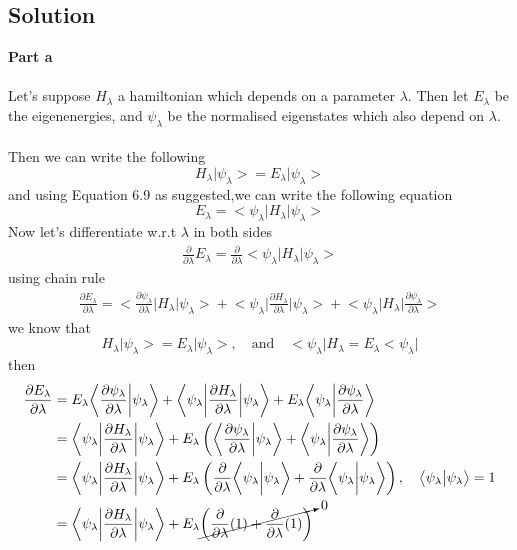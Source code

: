\documentclass[12 pt]{article}
\numberwithin{equation}{section}
\begin{document}
\subsection*{Solution}
\textbf{Part a}\\
\\
Let's suppose $H_\lambda$ a hamiltonian which depends on a parameter $\lambda$. Then let $E_\lambda$
be the eigenenergies, and $\psi_\lambda$ be the normalised
eigenstates which also depend on $\lambda$.\\
\\
Then we can write the following 
\[
  H_\lambda \big|\psi_\lambda\big> = E_\lambda\big|\psi_\lambda\big>
\]
and using Equation 6.9 as suggested,we can write the following equation
\[
  E_\lambda = \big<\psi_\lambda\big|H_\lambda\big|\psi_\lambda\big>
\]
Now let's differentiate w.r.t $\lambda$ in both sides
\begin{align*}
  \frac{\partial}{\partial \lambda} E_\lambda = \frac{\partial}{\partial \lambda}
  \big<\psi_\lambda\big|H_\lambda\big|\psi_\lambda\big>
\end{align*}
using chain rule
\begin{align*}
  \frac{\partial E_\lambda}{\partial \lambda} =
  \bigg<\frac{\partial \psi_\lambda}{\partial \lambda}\bigg|H_\lambda\bigg|\psi_\lambda\bigg>
  + \bigg<\psi_\lambda\bigg|\frac{\partial H_\lambda}{\partial \lambda}\bigg|\psi_\lambda\bigg>
  +  \bigg<\psi_\lambda\bigg|H_\lambda\bigg|\frac{\partial \psi_\lambda}{\partial \lambda}\bigg>
\end{align*}
we know that
\[
  H_\lambda\big|\psi_\lambda\big> =  E_\lambda\big|\psi_\lambda\big>,\quad \text{and}
  \quad\big<\psi_\lambda\big|H_\lambda = E_\lambda\big<\psi_\lambda\big| 
\]
then 
\begin{align*}
  \frac{\partial E_\lambda}{\partial \lambda}&=
  E_\lambda\bigg<\frac{\partial \psi_\lambda}{\partial \lambda}\bigg|\psi_\lambda\bigg>
  + \bigg<\psi_\lambda\bigg|\frac{\partial H_\lambda}{\partial \lambda}\bigg|\psi_\lambda\bigg>
  + E_\lambda\bigg<\psi_\lambda\bigg|\frac{\partial \psi_\lambda}{\partial \lambda}\bigg>\\
  &=
   \bigg<\psi_\lambda\bigg|\frac{\partial H_\lambda}{\partial \lambda}\bigg|\psi_\lambda\bigg>
   + E_\lambda\left(\bigg<\frac{\partial \psi_\lambda}{\partial \lambda}\bigg|\psi_\lambda\bigg>
   + \bigg<\psi_\lambda\bigg|\frac{\partial \psi_\lambda}{\partial \lambda}\bigg>\right)\\
  &= \bigg<\psi_\lambda\bigg|\frac{\partial H_\lambda}{\partial \lambda}\bigg|\psi_\lambda\bigg>
  + E_\lambda\left(\frac{\partial }{\partial \lambda}\bigg<\psi_\lambda\bigg|\psi_\lambda\bigg>
  +  \frac{\partial }{\partial \lambda}\bigg<\psi_\lambda\bigg|\psi_\lambda\bigg>\right), 
  \quad \big<\psi_\lambda\big|\psi_\lambda\big> = 1\\
  &= \bigg<\psi_\lambda\bigg|\frac{\partial H_\lambda}{\partial \lambda}\bigg|\psi_\lambda\bigg>
  + E_\lambda\cancelto{0}{\left(\frac{\partial }{\partial \lambda} (1)+\frac{\partial }{\partial \lambda} (1)
  \right)}
\end{align*}
\end{document}
